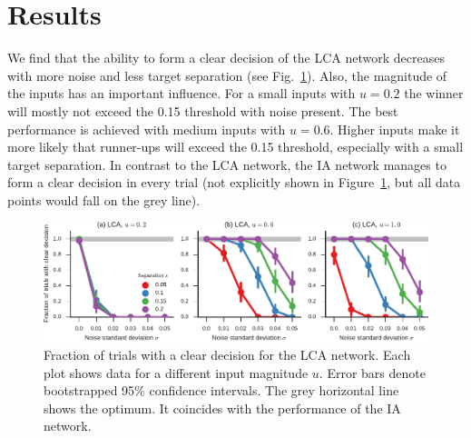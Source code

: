 \documentclass[10pt,letterpaper]{article}
\begin{document}
\section{Results}
We find that the ability to form a clear decision of the LCA network decreases with more noise and less target separation  (see Fig.~\ref{fig:decisions}).
Also, the magnitude of the inputs has an important influence.
For a small inputs with $u=0.2$ the winner will mostly not exceed the 0.15 threshold with noise present.
The best performance is achieved with medium inputs with $u=0.6$.
Higher inputs make it more likely that runner-ups will exceed the 0.15 threshold, especially with a small target separation.
In contrast to the LCA network, the IA network manages to form a clear decision in every trial (not explicitly shown in Figure~\ref{fig:decisions}, but all data points would fall on the grey line).
\begin{figure}[t]
    \centering
    \includegraphics{figures/decisions}
    \caption{
        Fraction of trials with a clear decision for the LCA network.
        Each plot shows data for a different input magnitude $u$.
        Error bars denote bootstrapped 95\% confidence intervals.
        The grey horizontal line shows the optimum.
        It coincides with the performance of the IA network.
    }\label{fig:decisions}
\end{figure}
\end{document}

